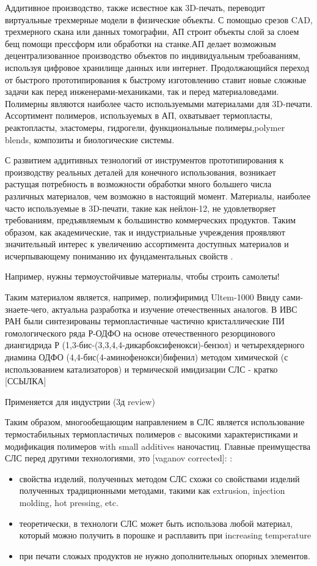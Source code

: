 

Аддитивное производство, также исвестное как 3D-печать, переводит виртуальные трехмерные модели в физические объекты. С помощью срезов CAD, трехмерного скана или данных томографии, АП строит объекты слой за слоем бещ помощи прессформ или обработки на станке.АП делает возможным децентрализованное производство объектов по индивидуальным требоаваниям, используя цифровое хранилище данных или интернет. 
Продолжающийся переход
от быстрого прототипирования к быстрому изготовлению ставит новые сложные задачи как перед инженерами-механиками, так и перед материаловедами.
Полимерны являются наиболее часто используемыми материалами для 3D-печати.
Ассортимент полимеров, используемых в АП, охватывает термопласты, реактопласты, эластомеры, гидрогели, функциональные полимеры,polymer blends, композиты и биологические системы.
\cite{3d-review}


С развитием аддитивных тезнологий от инструментов прототипирования к производству реальных деталей для конечного использования, возникает растущая потребность в возможности  обработки много большего числа различных материалов, чем возможно в настоящий момент. Материалы, наиболее часто используемые в 3D-печати, такие как нейлон-12, не удовлетворяет требованиям, предъявляемым к большинство коммерческих продуктов. Таким образом, как академические, так и индустриальные учреждения проявляют значительный интерес к увеличению ассортимента доступных материалов и исчерпывающему пониманию их фундаментальных свойств \cite{sls-material}.

Например, нужны термоустойчивые материалы, чтобы строить самолеты!

Таким материалом является, например, полиэфиримид Ultem-1000  Ввиду сами-знаете-чего, актуальна разработка и изучение отечественных аналогов. В ИВС РАН были синтезированы термопластичные частично кристаллические ПИ гомологического ряда Р-ОДФО на основе отечественного резорцинового диангидрида Р (1,3-бис-(3,3,4,4-дикарбоксифенокси)-бензол) и четырехядерного диамина ОДФО (4,4-бис(4-аминофенокси)бифенил) методом химической (с использованием катализаторов) и термической имидизации \cite{yudin-red}
СЛС - кратко [ССЫЛКА]

Применяется для индустрии (3д review)


Таким образом, многообещающим направлением в СЛС является использование  термостабильных термопластичых полимеров c высокими характеристиками и модификация полимеров with small additives наночастиц.
Главные преимущества СЛС перед другими технологиями, это 	[vaganov corrected]:
:
\begin{itemize}
    \item свойства изделий, полученных методом СЛС схожи со свойствами изделий полученных традиционными методами, такими как extrusion, injection molding, hot pressing, etc.
    \item теоретически, в технологи СЛС может быть использова любой материал, который можно получить в порошке и расплавить при increasing temperature
    \item при печати сложых продуктов не нужно дополнительных опорных элементов.
\end{itemize}

